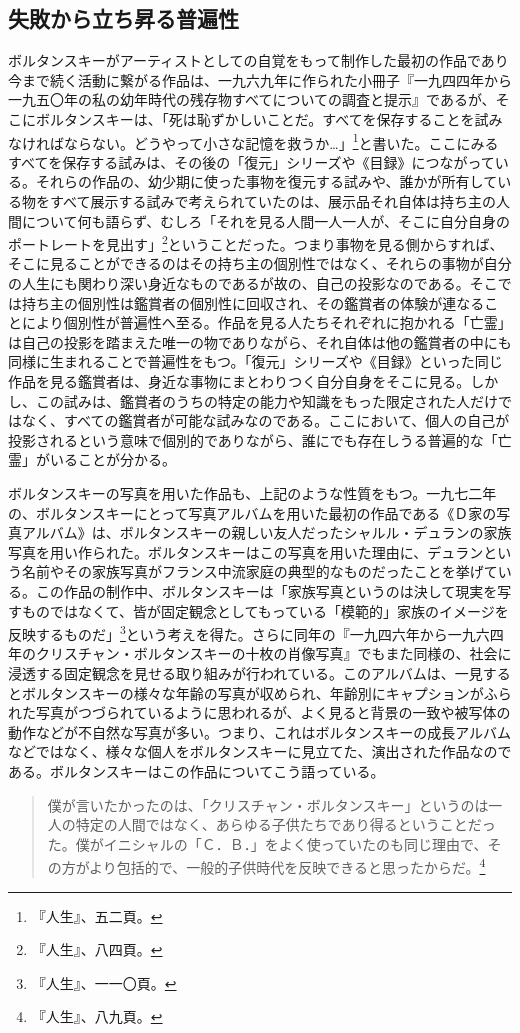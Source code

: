 \documentclass[b5j,twoside,twocolumn]{utarticle}
\begin{document}
\subsection{失敗から立ち昇る普遍性}
ボルタンスキーがアーティストとしての自覚をもって制作した最初の作品であり今まで続く活動に繋がる作品は、一九六九年に作られた小冊子『一九四四年から一九五〇年の私の幼年時代の残存物すべてについての調査と提示』であるが、そこにボルタンスキーは、「死は恥ずかしいことだ。すべてを保存することを試みなければならない。どうやって小さな記憶を救うか…」\footnote{『人生』、五二頁。}と書いた。ここにみるすべてを保存する試みは、その後の「復元」シリーズや《目録》につながっている。それらの作品の、幼少期に使った事物を復元する試みや、誰かが所有している物をすべて展示する試みで考えられていたのは、展示品それ自体は持ち主の人間について何も語らず、むしろ「それを見る人間一人一人が、そこに自分自身のポートレートを見出す」\footnote{『人生』、八四頁。}ということだった。つまり事物を見る側からすれば、そこに見ることができるのはその持ち主の個別性ではなく、それらの事物が自分の人生にも関わり深い身近なものであるが故の、自己の投影なのである。そこでは持ち主の個別性は鑑賞者の個別性に回収され、その鑑賞者の体験が連なることにより個別性が普遍性へ至る。作品を見る人たちそれぞれに抱かれる「亡霊」は自己の投影を踏まえた唯一の物でありながら、それ自体は他の鑑賞者の中にも同様に生まれることで普遍性をもつ。「復元」シリーズや《目録》といった同じ作品を見る鑑賞者は、身近な事物にまとわりつく自分自身をそこに見る。しかし、この試みは、鑑賞者のうちの特定の能力や知識をもった限定された人だけではなく、すべての鑑賞者が可能な試みなのである。ここにおいて、個人の自己が投影されるという意味で個別的でありながら、誰にでも存在しうる普遍的な「亡霊」がいることが分かる。


ボルタンスキーの写真を用いた作品も、上記のような性質をもつ。一九七二年の、ボルタンスキーにとって写真アルバムを用いた最初の作品である《Ｄ家の写真アルバム》は、ボルタンスキーの親しい友人だったシャルル・デュランの家族写真を用い作られた。ボルタンスキーはこの写真を用いた理由に、デュランという名前やその家族写真がフランス中流家庭の典型的なものだったことを挙げている。この作品の制作中、ボルタンスキーは「家族写真というのは決して現実を写すものではなくて、皆が固定観念としてもっている「模範的」家族のイメージを反映するものだ」\footnote{『人生』、一一〇頁。}という考えを得た。さらに同年の『一九四六年から一九六四年のクリスチャン・ボルタンスキーの十枚の肖像写真』でもまた同様の、社会に浸透する固定観念を見せる取り組みが行われている。このアルバムは、一見するとボルタンスキーの様々な年齢の写真が収められ、年齢別にキャプションがふられた写真がつづられているように思われるが、よく見ると背景の一致や被写体の動作などが不自然な写真が多い。つまり、これはボルタンスキーの成長アルバムなどではなく、様々な個人をボルタンスキーに見立てた、演出された作品なのである。ボルタンスキーはこの作品についてこう語っている。
\begin{quote}
僕が言いたかったのは、「クリスチャン・ボルタンスキー」というのは一人の特定の人間ではなく、あらゆる子供たちであり得るということだった。僕がイニシャルの「Ｃ．Ｂ．」をよく使っていたのも同じ理由で、その方がより包括的で、一般的子供時代を反映できると思ったからだ。\footnote{『人生』、八九頁。}
\end{quote}
\end{document}
